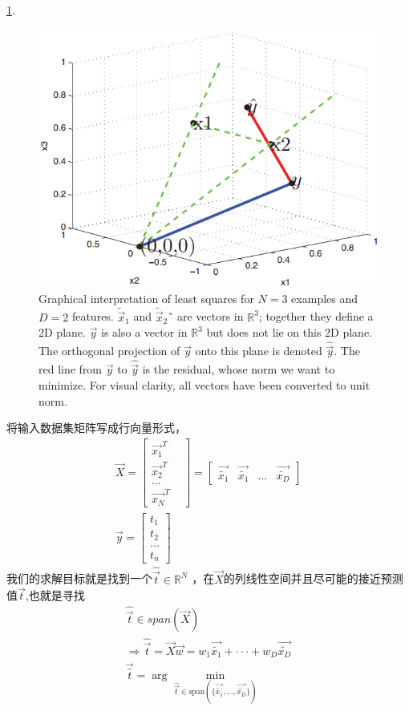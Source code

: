 \documentclass[a4paper]{article}
\begin{document}
\ref{fig:graphical-interpretation-of-OLS}.
\begin{figure}[hbtp]
	\centering
	\includegraphics[scale=.50]{graphical-interpretation-of-OLS.png}
	\caption{Graphical interpretation of least squares for $N=3$ examples and $D=2$ features. $\tilde{\vec{x}}_1$ and $\tilde{\vec{x}}_2$˜ are vectors in $\mathbb{R}^3$; together they define a 2D plane. $\vec{y}$ is also a vector in $\mathbb{R}^3$ but does not lie on this 2D plane. The orthogonal projection of $\vec{y}$ onto this plane is denoted $\hat{\vec{y}}$. The red line from $\vec{y}$ to $\hat{\vec{y}}$ is the residual, whose norm we want to minimize. For visual clarity, all vectors have been converted to unit norm.}
	\label{fig:graphical-interpretation-of-OLS} 
\end{figure}
将输入数据集矩阵写成行向量形式，
\begin{eqnarray}
\vec{X} = \begin{bmatrix}
\vec{x_1}^T &\\
\vec{x_2}^T &\\
...        &\\
\vec{x_N}^T
\end{bmatrix} 
= \begin{bmatrix}
\vec{\tilde{x_1}} & \vec{\tilde{x_1}} & ... &\vec{\tilde{x_D}}
\end{bmatrix}\\
\vec{y} = \begin{bmatrix}
t_1 \\
t_2 \\
... \\
t_n
\end{bmatrix} 
\end{eqnarray}
我们的求解目标就是找到一个$\hat{\vec{t}} \in \mathbb{R}^N$ ，在$\vec{X}$的列线性空间并且尽可能的接近预测值$\vec{t}$,也就是寻找
\begin{eqnarray}
\hat{\vec{t}} \in span(\vec{X}) \\
\Rightarrow \hat{\vec{t}} = \vec{X}\vec{w} = w_1\vec{\tilde{x_1}}+\cdot\cdot\cdot+w_D\vec{\tilde{x_D}} \\
\vec{\hat{t}}=\arg\min\limits_{\hat{\vec{t}} \in \text{span} (\{\vec{\tilde{x_1}},...,\vec{\tilde{x_D}}\})}
\end{eqnarray}
\end{document}
